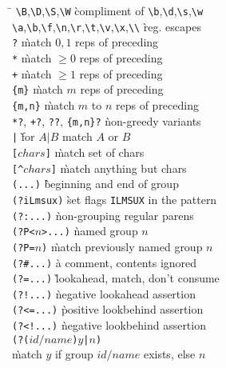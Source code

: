 \begin{tabbing}
\hspace{2em}\= \kill
\' \verb#\B#,\verb#\D#,\verb#\S#,\verb#\W# \` compliment of \verb#\b#,\verb#\d#,\verb#\s#,\verb#\w# \\
\' \verb#\a#,\verb#\b#,\verb#\f#,\verb#\n#,\verb#\r#,\verb#\t#,\verb#\v#,\verb#\x#,\verb#\\# \` reg. escapes \\
\' \verb#?# \` match $0,1$ reps of preceding \\
\' \verb#*# \` match $\geq 0$ reps of preceding \\
\' \verb#+# \` match $\geq 1$ reps of preceding \\
\' \verb#{m}# \` match $m$ reps of preceding \\
\' \verb#{m,n}# \` match $m$ to $n$ reps of preceding \\
\' \verb#*?#, \verb#+?#, \verb#??#, \verb#{m,n}?# \` non-greedy variants \\
\' \verb#|# \` for $A|B$ match $A$ or $B$ \\
\' \verb#[#$chars$\verb#]# \` match set of chars \\
\' \verb#[^#$chars$\verb#]# \` match anything but chars \\
\' \verb#(...)# \` beginning and end of group \\
\' \verb#(?iLmsux)# \` set$\!$ flags$\!$ \verb.ILMSUX. in$\!$ the$\!$ pattern \\
\' \verb#(?:...)# \` non-grouping regular parens \\
\' \verb#(?P<#$n$\verb#>...)# \` named group $n$ \\
\' \verb#(?P=#$n$\verb#)# \` match previously named group $n$ \\
\' \verb-(?#...)- \` a comment, contents ignored \\
\' \verb#(?=...)# \` lookahead,$\!$ match,$\!$ don't$\!$ consume \\
\' \verb#(?!...)# \` negative lookahead assertion \\
\' \verb#(?<=...)# \` positive lookbehind assertion \\
\' \verb#(?<!...)# \` negative lookbehind assertion \\
\' \verb#(?(#$id\!/\!name$\verb#)#$y$\verb#|#$n$\verb#)# \\ \` match $y$ if group $id/name$ exists, else $n$
\end{tabbing}